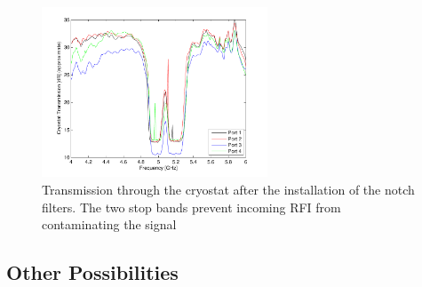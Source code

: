\begin{figure}
 \centering
 \includegraphics[width=0.6\textwidth]{./images/NotchFilter/CryostatTransmission.pdf}
 \caption{Transmission through the cryostat after the installation of the notch filters. The two stop bands prevent incoming RFI from contaminating the signal}
 \label{fig:cryostatTransmission}
\end{figure}
% 
% 

\clearpage

\subsection{Other Possibilities}

